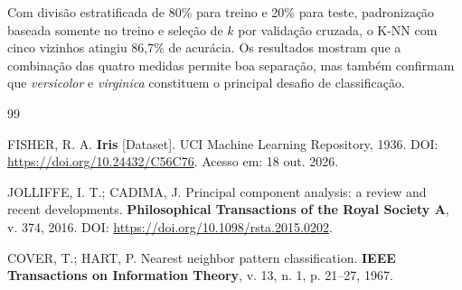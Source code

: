 \documentclass[12pt, a4paper, twoside, chapter=TITLE, subsection=TITLE,
section=TITLE, subsubsection=TITLE, english, brazil]{abntex2}
\begin{document}
Com divisão estratificada de 80\% para treino e 20\% para teste, padronização baseada somente no treino e seleção de $k$ por validação cruzada, o K-NN com cinco vizinhos atingiu 86,7\% de acurácia. Os resultados mostram que a combinação das quatro medidas permite boa separação, mas também confirmam que \textit{versicolor} e \textit{virginica} constituem o principal desafio de classificação.

\postextual
\begin{thebibliography}{99}

FISHER, R. A. \textbf{Iris} [Dataset]. UCI Machine Learning Repository, 1936. DOI: \url{https://doi.org/10.24432/C56C76}. Acesso em: 18 out. 2026.

JOLLIFFE, I. T.; CADIMA, J. Principal component analysis: a review and recent developments. \textbf{Philosophical Transactions of the Royal Society A}, v. 374, 2016. DOI: \url{https://doi.org/10.1098/rsta.2015.0202}.

COVER, T.; HART, P. Nearest neighbor pattern classification. \textbf{IEEE Transactions on Information Theory}, v. 13, n. 1, p. 21--27, 1967.

\end{thebibliography}
\end{document}
